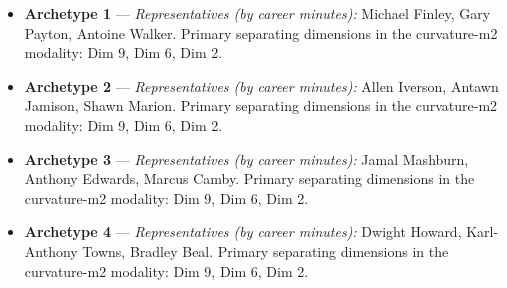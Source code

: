 \begin{itemize}
\item \textbf{Archetype 1} --- \emph{Representatives (by career minutes):} Michael Finley, Gary Payton, Antoine Walker. Primary separating dimensions in the curvature-m2 modality: Dim 9, Dim 6, Dim 2.
\item \textbf{Archetype 2} --- \emph{Representatives (by career minutes):} Allen Iverson, Antawn Jamison, Shawn Marion. Primary separating dimensions in the curvature-m2 modality: Dim 9, Dim 6, Dim 2.
\item \textbf{Archetype 3} --- \emph{Representatives (by career minutes):} Jamal Mashburn, Anthony Edwards, Marcus Camby. Primary separating dimensions in the curvature-m2 modality: Dim 9, Dim 6, Dim 2.
\item \textbf{Archetype 4} --- \emph{Representatives (by career minutes):} Dwight Howard, Karl-Anthony Towns, Bradley Beal. Primary separating dimensions in the curvature-m2 modality: Dim 9, Dim 6, Dim 2.
\end{itemize}
